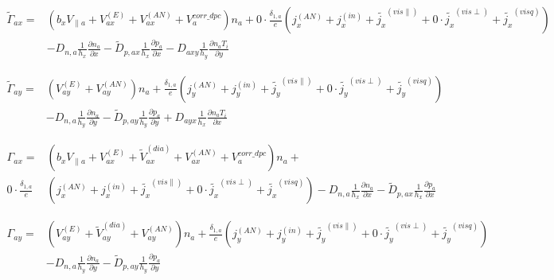 \documentclass[a4paper,10pt]{report}
\begin{document}
\begin{equation}
\begin{matrix}
\widetilde{ \Gamma}_{ax} =& \left( b_x V_{\parallel a} + V_{ax}^{\left( E \right)} + V_{ax}^{\left( AN \right)} + V_a^{corr\_dpc} \right) n_a + 0 \cdot \frac{\delta_{1,a}}{e} \left( j_x^{\left( AN \right)} + j_x^{\left( in \right)} + \widetilde{j_x}^{\left( vis \parallel \right)} + 0 \cdot \widetilde{j_x}^{\left( vis \perp \right)} + \widetilde{j_x}^{\left( visq \right)} \right) \\
&- D_{n,a} \frac{1}{h_x} \frac{\partial n_a}{\partial x} - \widetilde{D}_{p,ax} \frac{1}{h_x} \frac{\partial p_a}{\partial x} - D_{axy} \frac{1}{h_y} \frac{\partial n_a T_i}{\partial y}
\end{matrix}
\end{equation}

\begin{equation}
\begin{matrix}
\widetilde{ \Gamma}_{ay} =& \left( V_{ay}^{\left( E \right)} + V_{ay}^{\left( AN \right)} \right) n_a + \frac{\delta_{1,a}}{e} \left( j_y^{\left( AN \right)} + j_y^{\left( in \right)} + \widetilde{j_y}^{\left( vis \parallel \right)} + 0 \cdot \widetilde{j_y}^{\left( vis \perp \right)} + \widetilde{j_y}^{\left( visq \right)} \right) \\
& - D_{n,a} \frac{1}{h_y} \frac{\partial n_a}{\partial y} - \widetilde{D}_{p,ay} \frac{1}{h_y} \frac{\partial p_a}{\partial y} + D_{ayx} \frac{1}{h_x} \frac{\partial n_a T_i}{\partial x}
\end{matrix}
\end{equation}

\begin{equation}
\begin{matrix}
\Gamma_{ax} =& \left( b_x V_{\parallel a} + V_{ax}^{\left( E \right)} + \widetilde{V}_{ax}^{\left( dia \right)} + V_{ax}^{\left( AN \right)} + V_a^{corr\_dpc} \right) n_a + \\
0 \cdot \frac{\delta_{1,a}}{e} & \left( j_x^{\left( AN \right)} + j_x^{\left( in \right)} + \widetilde{j_x}^{\left( vis \parallel \right)} + 0 \cdot \widetilde{j_x}^{\left( vis \perp \right)} + \widetilde{j_x}^{\left( visq \right)} \right) - D_{n,a} \frac{1}{h_x} \frac{\partial n_a}{\partial x} - \widetilde{D}_{p,ax} \frac{1}{h_x} \frac{\partial p_a}{\partial x}
\end{matrix}
\end{equation}

\begin{equation}
\begin{matrix}
\Gamma_{ay} =& \left( V_{ay}^{\left( E \right)} + \widetilde{V}_{ay}^{\left( dia \right)} + V_{ay}^{\left( AN \right)} \right) n_a + \frac{\delta_{1,a}}{e} \left( j_y^{\left( AN \right)} + j_y^{\left( in \right)} + \widetilde{j_y}^{\left( vis \parallel \right)} + 0 \cdot \widetilde{j_y}^{\left( vis \perp \right)} + \widetilde{j_y}^{\left( visq \right)} \right) \\
&- D_{n,a} \frac{1}{h_y} \frac{\partial n_a}{\partial y} - \widetilde{D}_{p,ay} \frac{1}{h_y} \frac{\partial p_a}{\partial y}
\end{matrix}
\end{equation}
\end{document}

